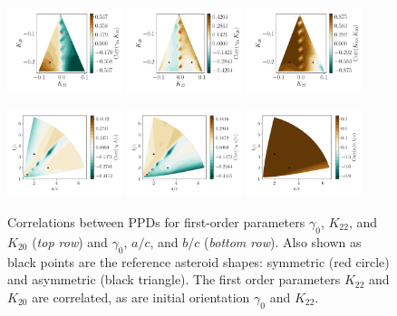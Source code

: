 \documentclass[fleqn,usenatbib]{mnras}
\begin{document}
\begin{figure}
  \includegraphics[width=0.3\textwidth]{figs/probe-space-corr12.pdf}\hfill
  \includegraphics[width=0.3\textwidth]{figs/probe-space-corr13.pdf}\hfill
  \includegraphics[width=0.3\textwidth]{figs/probe-space-corr23.pdf}

  \includegraphics[width=0.3\textwidth]{figs/probe-space-ab-1b.pdf}\hfill
  \includegraphics[width=0.3\textwidth]{figs/probe-space-ab-1a.pdf}\hfill
  \includegraphics[width=0.3\textwidth]{figs/probe-space-ab-ab.pdf}
  
  \caption{Correlations between PPDs for first-order parameters $\gamma_0$, $K_{22}$, and $K_{20}$ (\textit{top row}) and $\gamma_0$, $a/c$, and $b/c$ (\textit{bottom row}).  Also shown as black points are the reference asteroid shapes: symmetric (red circle) and asymmetric (black triangle). The first order parameters $K_{22}$ and $K_{20}$ are correlated, as are initial orientation $\gamma_0$ and $K_{22}$.}
  \label{fig:scan-space-corr}
\end{figure}
\end{document}

